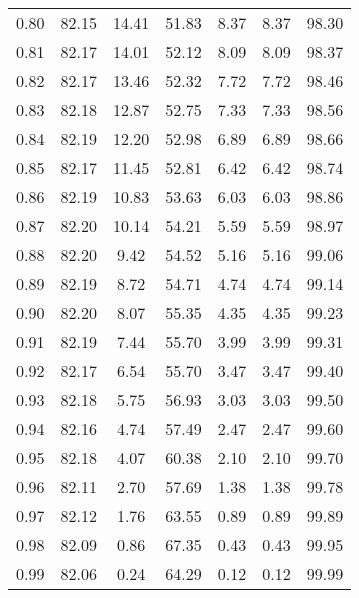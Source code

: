 \begin{tabular}{|c|c|c|c|c|c|c|}
      0.80 &     82.15 &     14.41 &      51.83 &    8.37 &       8.37 &         98.30 \\
      0.81 &     82.17 &     14.01 &      52.12 &    8.09 &       8.09 &         98.37 \\
      0.82 &     82.17 &     13.46 &      52.32 &    7.72 &       7.72 &         98.46 \\
      0.83 &     82.18 &     12.87 &      52.75 &    7.33 &       7.33 &         98.56 \\
      0.84 &     82.19 &     12.20 &      52.98 &    6.89 &       6.89 &         98.66 \\
      0.85 &     82.17 &     11.45 &      52.81 &    6.42 &       6.42 &         98.74 \\
      0.86 &     82.19 &     10.83 &      53.63 &    6.03 &       6.03 &         98.86 \\
      0.87 &     82.20 &     10.14 &      54.21 &    5.59 &       5.59 &         98.97 \\
      0.88 &     82.20 &      9.42 &      54.52 &    5.16 &       5.16 &         99.06 \\
      0.89 &     82.19 &      8.72 &      54.71 &    4.74 &       4.74 &         99.14 \\
      0.90 &     82.20 &      8.07 &      55.35 &    4.35 &       4.35 &         99.23 \\
      0.91 &     82.19 &      7.44 &      55.70 &    3.99 &       3.99 &         99.31 \\
      0.92 &     82.17 &      6.54 &      55.70 &    3.47 &       3.47 &         99.40 \\
      0.93 &     82.18 &      5.75 &      56.93 &    3.03 &       3.03 &         99.50 \\
      0.94 &     82.16 &      4.74 &      57.49 &    2.47 &       2.47 &         99.60 \\
      0.95 &     82.18 &      4.07 &      60.38 &    2.10 &       2.10 &         99.70 \\
      0.96 &     82.11 &      2.70 &      57.69 &    1.38 &       1.38 &         99.78 \\
      0.97 &     82.12 &      1.76 &      63.55 &    0.89 &       0.89 &         99.89 \\
      0.98 &     82.09 &      0.86 &      67.35 &    0.43 &       0.43 &         99.95 \\
      0.99 &     82.06 &      0.24 &      64.29 &    0.12 &       0.12 &         99.99 \\
\bottomrule
\end{tabular}
